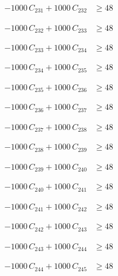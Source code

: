 \documentclass[a4paper,11pt]{article}
\begin{document}
\begin{align}
-1000\,C_{231} + 1000\,C_{232} &\geq 48 \nonumber
\end{align}

\begin{align}
-1000\,C_{232} + 1000\,C_{233} &\geq 48 \nonumber
\end{align}

\begin{align}
-1000\,C_{233} + 1000\,C_{234} &\geq 48 \nonumber
\end{align}

\begin{align}
-1000\,C_{234} + 1000\,C_{235} &\geq 48 \nonumber
\end{align}

\begin{align}
-1000\,C_{235} + 1000\,C_{236} &\geq 48 \nonumber
\end{align}

\begin{align}
-1000\,C_{236} + 1000\,C_{237} &\geq 48 \nonumber
\end{align}

\begin{align}
-1000\,C_{237} + 1000\,C_{238} &\geq 48 \nonumber
\end{align}

\begin{align}
-1000\,C_{238} + 1000\,C_{239} &\geq 48 \nonumber
\end{align}

\begin{align}
-1000\,C_{239} + 1000\,C_{240} &\geq 48 \nonumber
\end{align}

\begin{align}
-1000\,C_{240} + 1000\,C_{241} &\geq 48 \nonumber
\end{align}

\begin{align}
-1000\,C_{241} + 1000\,C_{242} &\geq 48 \nonumber
\end{align}

\begin{align}
-1000\,C_{242} + 1000\,C_{243} &\geq 48 \nonumber
\end{align}

\begin{align}
-1000\,C_{243} + 1000\,C_{244} &\geq 48 \nonumber
\end{align}

\begin{align}
-1000\,C_{244} + 1000\,C_{245} &\geq 48 \nonumber
\end{align}
\end{document}
